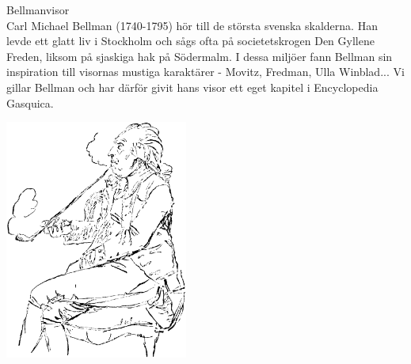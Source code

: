 \begin{flushleft}
{\Huge Bellmanvisor\\}
\vspace{1cm}
{\Large Carl Michael Bellman (1740-1795) hör till de största svenska skalderna.
Han levde ett glatt liv i Stockholm och sågs ofta på societetskrogen Den Gyllene Freden, liksom på sjaskiga hak på Södermalm.
I dessa miljöer fann Bellman sin inspiration till visornas mustiga karaktärer - Movitz, Fredman, Ulla Winblad...
Vi gillar Bellman och har därför givit hans visor ett eget kapitel i Encyclopedia Gasquica.}
\end{flushleft}

\vspace{2cm}
\begin{center}
\includegraphics[width=6cm]{bilder/bellman.png}
\end{center}
\newpage

\newpage
{}
\newpage
{}
\newpage
{}
